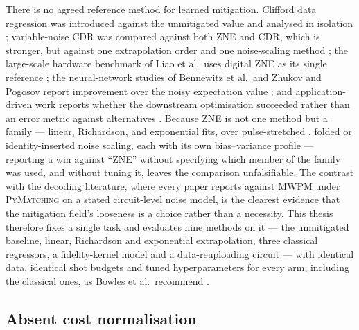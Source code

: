\documentclass[Thesis.tex]{subfiles}
\begin{document}
There is no agreed reference method for
learned mitigation. Clifford data regression was introduced against the
unmitigated value and analysed in isolation \cite{czarnik2021clifford};
variable-noise CDR was compared against both ZNE and CDR, which is stronger,
but against one extrapolation order and one noise-scaling method
\cite{lowe2021unified}; the large-scale hardware benchmark of Liao et al.\ uses
digital ZNE as its single reference \cite{liao2024machine}; the
neural-network studies of Bennewitz et al.\ and Zhukov and Pogosov report
improvement over the noisy expectation value
\cite{bennewitz2022neural,zhukov2024quantum}; and application-driven work
reports whether the downstream optimisation succeeded rather than an error
metric against alternatives \cite{sack2024large}. Because ZNE is not one
method but a family --- linear, Richardson, and exponential fits, over
pulse-stretched \cite{kandala2019extends}, folded
\cite{giurgicatiron2020digital} or identity-inserted \cite{he2020zero} noise
scaling, each with its own bias--variance profile
\cite{endo2018practical,cai2021multiexponential} --- reporting a win against
``ZNE'' without specifying which member of the family was used, and without
tuning it, leaves the comparison unfalsifiable. The contrast with the decoding
literature, where every paper reports against MWPM under
\textsc{PyMatching} \cite{higgott2022pymatching} on a stated circuit-level
noise model, is the clearest evidence that the mitigation field's looseness is
a choice rather than a necessity. This thesis therefore fixes a single task and
evaluates nine methods on it --- the unmitigated baseline, linear, Richardson
and exponential extrapolation, three classical regressors, a fidelity-kernel
model and a data-reuploading circuit --- with identical data, identical shot
budgets and tuned hyperparameters for every arm, including the classical ones,
as Bowles et al.\ recommend \cite{bowles2024better}.

\subsection{Absent cost normalisation}
\end{document}
